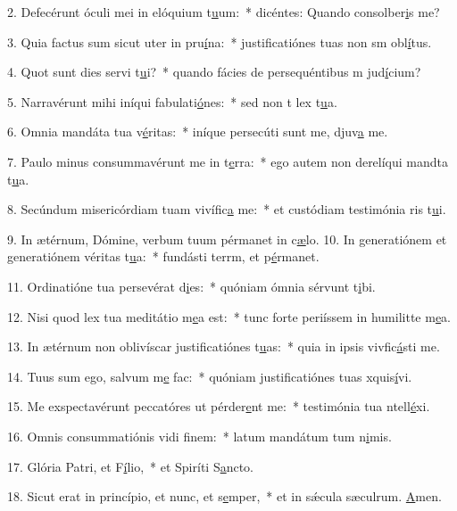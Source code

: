 2. Defecérunt óculi mei in elóquium t\uline{u}um:~* dicéntes: Quando consolber\uline{i}s me?\par 
3. Quia factus sum sicut uter in pru\uline{í}na:~* justificatiónes tuas non sm obl\uline{í}tus.\par 
4. Quot sunt dies servi t\uline{u}i?~* quando fácies de persequéntibus m jud\uline{í}cium?\par 
5. Narravérunt mihi iníqui fabulati\uline{ó}nes:~* sed non t lex t\uline{u}a.\par 
6. Omnia mandáta tua v\uline{é}ritas:~* iníque persecúti sunt me, djuv\uline{a} me.\par 
7. Paulo minus consummavérunt me in t\uline{e}rra:~* ego autem non derelíqui mandta t\uline{u}a.\par 
8. Secúndum misericórdiam tuam vivífic\uline{a} me:~* et custódiam testimónia ris t\uline{u}i.\par 
9. In ætérnum, Dómine, verbum tuum pérmanet in c\uline{æ}lo.
10. In generatiónem et generatiónem véritas t\uline{u}a:~* fundásti terrm, et p\uline{é}rmanet.\par 
11. Ordinatióne tua persevérat d\uline{i}es:~* quóniam ómnia sérvunt t\uline{i}bi.\par 
12. Nisi quod lex tua meditátio m\uline{e}a est:~* tunc forte periíssem in humilitte m\uline{e}a.\par 
13. In ætérnum non oblivíscar justificatiónes t\uline{u}as:~* quia in ipsis vivfic\uline{á}sti me.\par 
14. Tuus sum ego, salvum m\uline{e} fac:~* quóniam justificatiónes tuas xquis\uline{í}vi.\par 
15. Me exspectavérunt peccatóres ut pérder\uline{e}nt me:~* testimónia tua ntell\uline{é}xi.\par 
16. Omnis consummatiónis vidi f\uline{i}nem:~* latum mandátum tum n\uline{i}mis.\par 
17. Glória Patri, et F\uline{í}lio,~* et Spiríti S\uline{a}ncto.\par 
18. Sicut erat in princípio, et nunc, et s\uline{e}mper,~* et in sǽcula sæculrum. \uline{A}men.\par 
